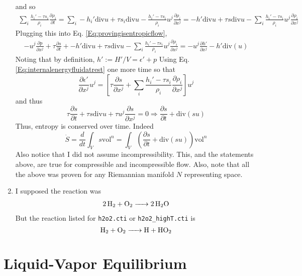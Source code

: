 \documentclass[10pt]{amsart}
\begin{document}
\begin{multicols*}{2}
\begin{enumerate}
\[\]
and so
\[
\begin{gathered}
  \sum_i \frac{ h_i' - \tau s_i}{ \rho_i} \frac{ \partial \rho_i}{ \partial t} = \sum_i -h_i' \text{div}u + \tau s_i \text{div}u - \frac{ h_i' - \tau s_i }{ \rho_i} u^j \frac{ \partial \rho_i}{ \partial x^j} = -h' \text{div}u + \tau s \text{div}u - \sum_i \frac{ h_i' - \tau s_i }{ \rho_i} u^j \frac{ \partial \rho_i}{ \partial x^j}
\end{gathered}
\]
Plugging this into Eq. \ref{Eq:provingisentropicflow}, 
\[
\begin{gathered}
  -u^j \frac{ \partial p}{ \partial x^j} + \tau \frac{ \partial s}{ \partial t} + -h' \text{div}u + \tau s \text{div}u - \sum_i \frac{ h_i' - \tau s_i }{ \rho_i} u^j \frac{ \partial \rho_i}{ \partial x^j}  =  - u^j \frac{ \partial h'}{ \partial x^j} - h'\text{div}(u)
\end{gathered}
\]
Noting that by definition, $h':= H'/V = \epsilon' +p$
Using Eq. \ref{Eq:internalenergyfluidatrest} one more time so that
\[
 \frac{ \partial \epsilon'}{ \partial x^j} u^j= \left[ \tau \frac{ \partial s}{ \partial x^j} + \sum_i \frac{h_i'-\tau s_i}{\rho_i} \frac{ \partial \rho_i}{ \partial x^j} \right]u^j
\]
and thus
\[
\tau \frac{ \partial s}{ \partial t} + \tau s\text{div}u + \tau u^j \frac{ \partial s }{ \partial x^j} = 0 \Longrightarrow \boxed{ \frac{ \partial s}{ \partial t} + \text{div}(su) }
\]
Thus, entropy is conserved over time.  Indeed
\[
\dot{S} = \frac{d}{dt} \int_V s \text{vol}^n = \int_V \left( \frac{ \partial s}{ \partial t} + \text{div}(su)  \right) \text{vol}^n
\]
Also notice that I did not assume incompressibility.  This, and the statements above, are true for compressible and incompressible flow.  Also, note that all the above was proven for any Riemannian manifold $N$ representing space.  \item I supposed the reaction was \[
\begin{gathered}
  \ce{2H2 + O2 -> 2H2O }   
\end{gathered}
\]
But the reaction listed for \verb|h2o2.cti| or \verb|h2o2_highT.cti| is 
\[
\ce{H2 + O2 -> H + HO2 }
\]
\end{enumerate}

\section{Liquid-Vapor Equilibrium}


\end{multicols*}
\end{document}
